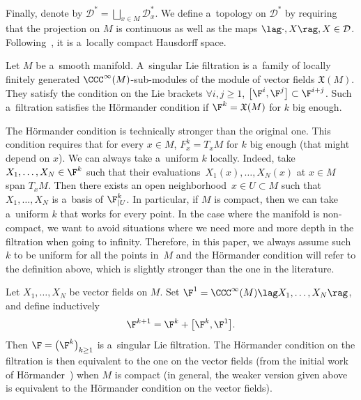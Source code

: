 Finally, denote by $\mathcal{D}^* = \bigsqcup_{x\in M}\mathcal{D}_x^*$. We define a~topology on $\mathcal{D}^*$ by requiring that the projection on $M$ is continuous as well as the maps $\lag \cdot, X \rag, X\in \mathcal{D}$. Following~\cite[Proposition~2.10]{AndroulidakisSkandalisPseudoDiff}, it is a~locally compact Hausdorff space.

\begin{mydef}
 Let $M$ be a~smooth manifold. A~singular Lie filtration is a~family  of locally finitely generated $\CCC^{\infty}(M)$-sub-modules of the module of vector fields $\mathfrak{X}(M)$. They satisfy the condition on the Lie brackets $\forall i,j\geq 1$, $\big[\F^i,\F^j\big] \subset \F^{i+j}$.
 Such a~filtration satisfies the H\"ormander condition if $\F^k = \mathfrak{X}(M)$ for $k$ big enough.
\end{mydef}

The H\"ormander condition is technically stronger than the original one. This condition requires that for every $x\in M$, $F^k_x = T_xM$ for $k$ big enough (that might depend on $x$). We can always take a~uniform $k$ locally. Indeed, take $X_1,\dots,X_N \in \F^k$ such that their evaluations~${X_1(x),\dots,X_N(x)}$ at $x\in M$ span $T_xM$. Then there exists an open neighborhood~${x\in U\subset M}$ such that $X_1, \dots, X_N$ is a~basis of $\F^k_{|U}$. In particular, if $M$ is compact, then we can take a~uniform $k$ that works for every point. In the case where the manifold is non-compact, we want to avoid situations where we need more and more depth in the filtration when going to infinity. Therefore, in this paper, we always assume such $k$ to be uniform for all the points in~$M$ and the H\"ormander condition will refer to the definition above, which is slightly stronger than the one in the literature.

\begin{ex}
 Let $X_1, \dots, X_N$ be vector fields on $M$. Set $\F^1 = \CCC^{\infty}(M)\lag X_1,\dots,X_N\rag$, and define inductively
 \[\F^{k+1} = \F^k + \big[\F^k,\F^1\big].\] Then $\F = \bigl(\F^k\bigr)_{k\geq 1}$ is a~singular Lie filtration. The H\"ormander condition on the filtration is then equivalent to the one on the vector fields (from the initial work of H\"ormander~\cite{Hormander}) when $M$ is compact (in general, the weaker version given above is equivalent to the H\"ormander condition on the vector fields).
\end{ex}

